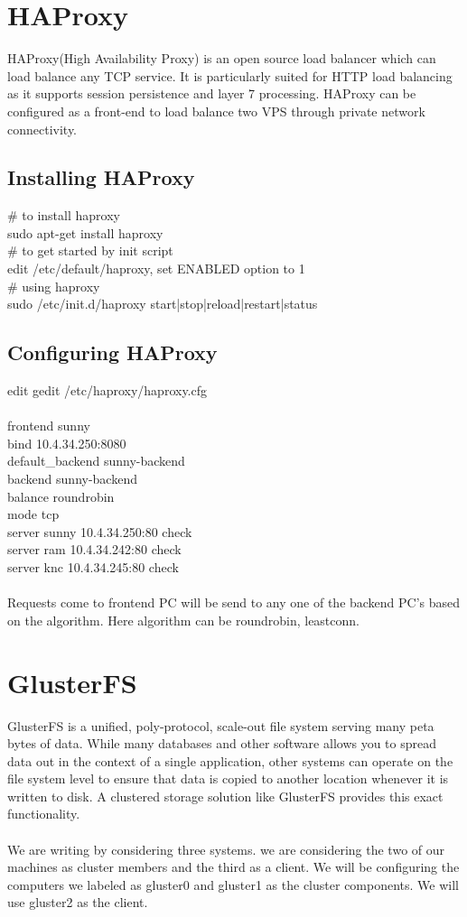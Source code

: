 \documentclass[12pt]{report}
\begin{document}
\section{HAProxy}
HAProxy(High Availability Proxy) is an open source load balancer which can load balance any TCP service. It is particularly suited for HTTP load balancing as it supports session persistence and layer 7 processing. HAProxy can be configured as a front-end to load balance two VPS through private network connectivity.\\
\subsection{Installing HAProxy}
\# to install haproxy\\
sudo apt-get install haproxy\\
\# to get started by init script\\
edit /etc/default/haproxy, set ENABLED option to 1\\
\# using haproxy\\
sudo /etc/init.d/haproxy {start|stop|reload|restart|status}\\
\subsection{Configuring HAProxy}
edit gedit /etc/haproxy/haproxy.cfg\\
\\
frontend sunny\\
   bind 10.4.34.250:8080\\
   default\_backend sunny-backend\\
backend sunny-backend\\
   balance roundrobin\\
   mode tcp\\
   server sunny 10.4.34.250:80 check\\
   server ram 10.4.34.242:80 check\\
   server knc 10.4.34.245:80 check\\
\\
Requests come to frontend PC will be send to any one of the backend PC's based on the algorithm. Here algorithm can be roundrobin, leastconn.\\

\pagebreak
\section{GlusterFS}
	GlusterFS is a unified, poly-protocol, scale-out file system serving many peta bytes of data. While many databases and other software allows you to spread data out in the context of a single application, other systems can operate on the file system level to ensure that data is copied to another location whenever it is written to disk. A clustered storage solution like GlusterFS provides this exact functionality.\\
\\
	We are writing by considering three systems. we are considering the two of our machines as cluster members and the third as a client. We will be configuring the computers we labeled as gluster0 and gluster1 as the cluster components. We will use gluster2 as the client.
\end{document}
